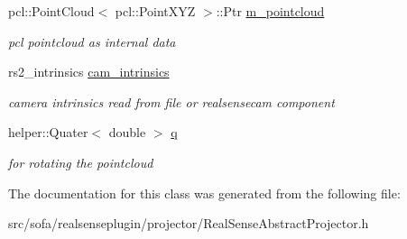 \begin{DoxyCompactItemize}
pcl\+::\+Point\+Cloud$<$ pcl\+::\+Point\+X\+YZ $>$\+::Ptr \hyperlink{classsofa_1_1rgbdtracking_1_1_real_sense_abstract_deprojector_a3317c507cc889b1537c708abb50196da}{m\+\_\+pointcloud}
\begin{DoxyCompactList}\small\item\em pcl pointcloud as internal data \end{DoxyCompactList}\item 
\mbox{\label{classsofa_1_1rgbdtracking_1_1_real_sense_abstract_deprojector_abb8025a1f9a471ec9370263b637271f4}} 
rs2\+\_\+intrinsics \hyperlink{classsofa_1_1rgbdtracking_1_1_real_sense_abstract_deprojector_abb8025a1f9a471ec9370263b637271f4}{cam\+\_\+intrinsics}
\begin{DoxyCompactList}\small\item\em camera intrinsics read from file or realsensecam component \end{DoxyCompactList}\item 
\mbox{\label{classsofa_1_1rgbdtracking_1_1_real_sense_abstract_deprojector_a6e37f417806e58524bc932ebdfcd3c74}} 
helper\+::\+Quater$<$ double $>$ \hyperlink{classsofa_1_1rgbdtracking_1_1_real_sense_abstract_deprojector_a6e37f417806e58524bc932ebdfcd3c74}{q}
\begin{DoxyCompactList}\small\item\em for rotating the pointcloud \end{DoxyCompactList}\end{DoxyCompactItemize}


The documentation for this class was generated from the following file\+:\begin{DoxyCompactItemize}
\item 
src/sofa/realsenseplugin/projector/Real\+Sense\+Abstract\+Projector.\+h\end{DoxyCompactItemize}
